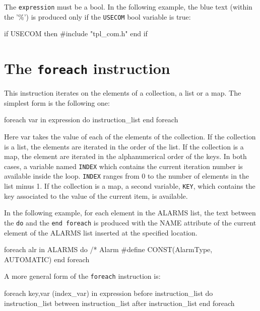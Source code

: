 \documentclass[10pt,openright,twosides]{report}
\newcommand{\var}[1]{{\small\ttfamily #1}}
\newcommand{\ccst}[1]{{\footnotesize\ttfamily\colorbox{light-blue}{'#1'}}}
\newcommand{\gtlinline}[1]{\colorbox{light-blue}{\lstinline[language=gtl]{#1}}}
\begin{document}
The \gtlinline{expression} must be a bool. In the following example, the blue text (within the \ccst{\%}) is produced only if the \gtlinline{USECOM} bool variable is true:

\begin{gtl}
if USECOM then %
#include "tpl_com.h" %
end if
\end{gtl}

\section{The \texttt{foreach} instruction}

This instruction iterates on the elements of a collection, a list or a map. The simplest form is the following one:

\begin{gtl}
foreach var in expression do
  instruction_list
end foreach
\end{gtl}

Here var takes the value of each of the elements of the collection. If the collection is a list, the elements are iterated in the order of the list. If the collection is a map, the element are iterated in the alphanumerical order of the keys. In both cases, a variable named \lstinline{INDEX} which contains the current iteration number is available inside the loop. \lstinline{INDEX} ranges from 0 to the number of elements in the list minus 1. If the collection is a map, a second variable, \lstinline{KEY}, which contains the key associated to the value of the current item, is available.

In the following example, for each element in the \var{ALARMS} list, the text between the \lstinline{do} and the \lstinline{end foreach} is produced with the \var{NAME} attribute of the current element of the \var{ALARMS} list inserted at the specified location.

\begin{gtl}
foreach alr in ALARMS do
%
/* Alarm %
#define %
CONST(AlarmType, AUTOMATIC) %
%
end foreach
\end{gtl}

A more general form of the \lstinline{foreach} instruction is:

\begin{gtl}
foreach key,var (index_var) in expression
  before
    instruction_list
  do 
    instruction_list
  between
    instruction_list
  after 
    instruction_list
end foreach
\end{gtl}
\end{document}

